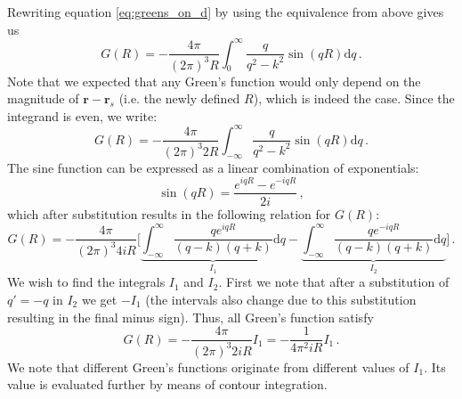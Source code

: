 Rewriting equation \ref{eq:greens_on_d} by using the equivalence from above gives us
\begin{equation}
    G(R) = -\frac{4 \pi}{(2\pi)^3 R} \int_0^\infty \frac{q}{q^2-k^2} \sin(q R) \mathrm d q \,.\nonumber
\end{equation}
Note that we expected that any Green's function would only depend on the magnitude of $\mathbf r - \mathbf r_s$ (i.e. the newly defined $R$), which is indeed the case.
Since the integrand is even, we write:
\begin{equation}
    G(R) = -\frac{4 \pi}{(2\pi)^3 2R} \int_{-\infty}^\infty \frac{q}{q^2-k^2} \sin(q R) \mathrm d q\,. \nonumber
\end{equation}
The sine function can be expressed as a linear combination of exponentials:
\begin{equation}
    \sin(q R) = \frac{e^{iq R} - e^{-iq R}}{2i} \,, \nonumber
\end{equation}
which after substitution results in the following relation for $G(R)$:
\begin{equation}
    G(R) = -\frac{4 \pi}{(2\pi)^3 4iR} \bigg[ \underbrace{\int_{-\infty}^\infty \frac{q e^{i q R}}{(q-k)(q+k)} \mathrm d q}_{I_1} - \underbrace{\int_{-\infty}^\infty \frac{q e^{-i q R}}{(q-k)(q+k)} \mathrm d q}_{I_2} \bigg] \,.\label{eq:greens_2}
\end{equation}
We wish to find the integrals $I_1$ and $I_2$.
First we note that after a substitution of $q' = -q$ in $I_2$ we get $-I_1$ (the intervals also change due to this substitution resulting in the final minus sign).
Thus, all Green's function satisfy
\begin{equation}
    G(R) = -\frac{4 \pi}{(2\pi)^3 2iR} I_1 = -\frac{1}{4\pi^2 i R} I_1  \,.\nonumber
\end{equation}
We note that different Green's functions originate from different values of $I_1$.
Its value is evaluated further by means of contour integration.

